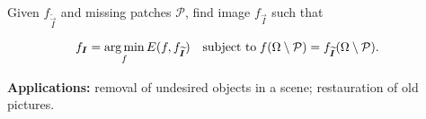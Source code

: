 Given $f_{\widetilde{\vec{I}}}$ and missing patches $\mathcal{P}$, find image $f_{\vec{I}}$ such that

\begin{align*}
	f_{\bm{I}} &= \operatorname*{arg\,min}_f E(f,f_{\widetilde{\bm{I}}}) \quad \text{subject to}\; f(\Omega \setminus \mathcal{P}) = f_{\widetilde{\bm{I}}}(\Omega \setminus \mathcal{P}).
\end{align*}

\textbf{Applications:} removal of undesired objects in a scene; restauration of old pictures. 

\begin{figure}
\center
{}\hspace{2em}%
\end{figure}
